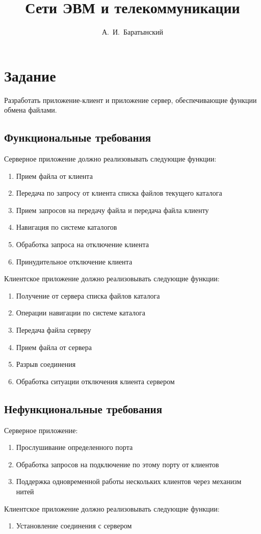 \documentclass[12pt,a4paper]{report}
\author{А.~И.~Баратынский}
\title{Сети ЭВМ и телекоммуникации}
\begin{document}
\listoftodos
\maketitle
\chapter{Задание}
Разработать приложение-клиент и приложение сервер, обеспечивающие функции обмена файлами.
\section{Функциональные требования}
Серверное приложение должно реализовывать следующие функции:
\begin{enumerate}
\item{Прием файла от клиента}
\item{Передача по запросу от клиента списка файлов текущего каталога}
\item{Прием запросов на передачу файла и передача файла клиенту}
\item{Навигация по системе каталогов}
\item{Обработка запроса на отключение клиента}
\item{Принудительное отключение клиента}
\end{enumerate}

Клиентское приложение должно реализовывать следующие функции:
\begin{enumerate}
\item{Получение от сервера списка файлов каталога}
\item{Операции навигации по системе каталога}
\item{Передача файла серверу}
\item{Прием файла от сервера}
\item{Разрыв соединения}
\item{Обработка ситуации отключения клиента сервером}
\end{enumerate}

\section{Нефункциональные требования}
Серверное приложение:
\begin{enumerate}
\item{Прослушивание определенного порта}
\item{Обработка запросов на подключение по этому порту от клиентов}
\item{Поддержка одновременной работы нескольких клиентов через механизм нитей}
\end{enumerate}
Клиентское приложение должно реализовывать следующие функции:
\begin{enumerate}
\item{Установление соединения с сервером}
\end{enumerate}
\end{document}
